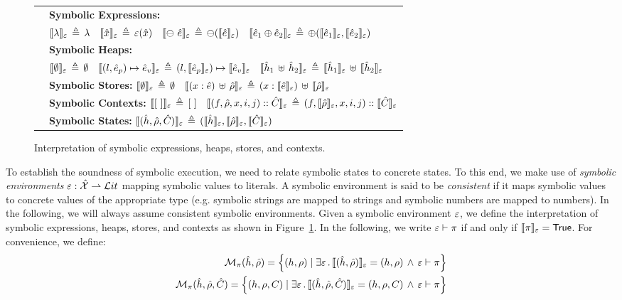 \begin{figure}[ht!]
{
\begin{tabular}{l}
$\quad${\bf Symbolic Expressions:}  \\
$
\quad
\llbracket \lambda \rrbracket_{\varepsilon} \,\triangleq\, \lambda
\quad 
\llbracket \hat{x} \rrbracket_{\varepsilon} \,\triangleq\, \varepsilon(\hat{x})
\quad 
\llbracket \ominus\ \hat{e} \rrbracket_{\varepsilon} \,\triangleq\, \ominus (\llbracket \hat{e} \rrbracket_{\varepsilon})
\quad 
\llbracket \hat{e}_1 \oplus \hat{e}_2 \rrbracket_{\varepsilon} \,\triangleq\, \oplus(\llbracket \hat{e}_1 \rrbracket_{\varepsilon}, \llbracket \hat{e}_2 \rrbracket_{\varepsilon}) 
$
\\[3pt]
$\quad${\bf Symbolic Heaps:}  \\
$
\quad
 \llbracket \emptyset \rrbracket_{\varepsilon} \,\triangleq\, \emptyset
\quad
\llbracket (l, \hat{e}_p) \mapsto \hat{e}_v \rrbracket_{\varepsilon} \,\triangleq\,  (l, \llbracket \hat{e}_p \rrbracket_{\varepsilon}) \mapsto \llbracket \hat{e}_v \rrbracket_{\varepsilon}
\quad
\llbracket \hat{h}_1 \, \uplus \, \hat{h}_2 \rrbracket_{\varepsilon} \,\triangleq\,  \llbracket \hat{h}_1 \rrbracket_{\varepsilon} \, \uplus \, \llbracket \hat{h}_2 \rrbracket_{\varepsilon}
$%
\\[3pt]
$\quad${\bf Symbolic Stores:}  
$
 \llbracket \emptyset \rrbracket_{\varepsilon} \,\triangleq\, \emptyset
\quad 
 \llbracket (x: \hat{e}) \, \uplus \, \hat\rho \rrbracket_{\varepsilon} \,\triangleq\, (x: \llbracket \hat{e} \rrbracket_{\varepsilon}) \, \uplus \, \llbracket \hat\rho \rrbracket_{\varepsilon}
$%
\\[3pt]
$\quad${\bf Symbolic Contexts:}  
$ \llbracket [ \ ] \rrbracket_{\varepsilon} \,\triangleq\, [ \ ]
\quad 
 \llbracket (f, \hat\rho, x, i, j) :: \hat{C} \rrbracket_{\varepsilon} \,\triangleq\, (f, \llbracket \hat\rho \rrbracket_{\varepsilon}, x, i, j) :: \llbracket \hat{C} \rrbracket_{\varepsilon}
$%

\\[3pt]
$\quad${\bf Symbolic States:}  $\llbracket (\hat{h}, \hat\rho, \hat{C}) \rrbracket_{\varepsilon} \,\triangleq\, (\llbracket \hat{h} \rrbracket_{\varepsilon}, \llbracket \hat\rho \rrbracket_{\varepsilon}, \llbracket \hat{C} \rrbracket_{\varepsilon})$
\end{tabular}
}
\caption{Interpretation of symbolic expressions, heaps, stores, and contexts.\label{fig:symbolic:interp}}
\end{figure}

 To establish the soundness of symbolic execution, we need to relate 
symbolic states to concrete states. To this end, we make use of \emph{symbolic environments} 
$\varepsilon : \hat{\mathcal{X}} \rightharpoonup \mathcal{L}it$ mapping symbolic values to \jsil literals. 
A symbolic environment is said to be \emph{consistent} if it maps symbolic 
values to concrete values of the appropriate type (e.g. symbolic strings are mapped to strings 
and symbolic numbers are mapped to numbers). In the following, we will always 
assume consistent symbolic environments. 
%
Given a symbolic environment $\varepsilon$, we define the interpretation of symbolic 
expressions, heaps, stores, and contexts as shown in Figure~\ref{fig:symbolic:interp}. 
In the following, we write $\varepsilon \vdash \pi$  if and only if $\llbracket \pi \rrbracket_{\varepsilon} = \mathsf{True}$. For convenience, we define: 
\begin{align}
\mathcal{M}_{\pi}(\hat{h}, \hat\rho) = \left\{ (h, \rho) \mid \exists \varepsilon \, . \,  \llbracket (\hat{h}, \hat\rho) \rrbracket_{\varepsilon} = (h, \rho) \, \wedge \,  \varepsilon \vdash \pi  \right\}  
\\
\mathcal{M}_{\pi}(\hat{h}, \hat\rho, \hat{C}) = \left\{ (h, \rho, C) \mid \exists \varepsilon \, . \,  \llbracket (\hat{h}, \hat\rho, \hat{C}) \rrbracket_{\varepsilon} = (h, \rho, C) \, \wedge \,  \varepsilon \vdash \pi  \right\} 
\end{align}

